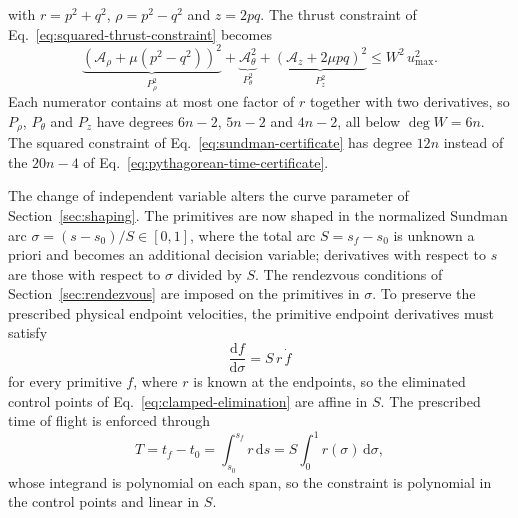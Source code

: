 with $r=p^2+q^2$, $\rho=p^2-q^2$ and $z=2pq$. The thrust constraint of
Eq.~\eqref{eq:squared-thrust-constraint} becomes
\begin{equation}
	\underbrace{
		\left(\mathcal A_\rho+\mu (p^2-q^2)\right)^2
	}_{P_\rho^{2}}
	+
	\underbrace{
		\mathcal A_\theta^{2}
	}_{P_\theta^{2}}
	+
	\underbrace{
		\left(\mathcal A_z+2\mu pq\right)^2
	}_{P_z^{2}}
	\leq
	W^2\,u_{\max}^2.
	\label{eq:sundman-certificate}
\end{equation}
Each numerator contains at most one factor of $r$ together with two
derivatives, so $P_\rho$, $P_\theta$ and $P_z$ have degrees $6n-2$, $5n-2$
and $4n-2$, all below $\deg W=6n$. The squared constraint of
Eq.~\eqref{eq:sundman-certificate} has degree $12n$ instead of the $20n-4$
of Eq.~\eqref{eq:pythagorean-time-certificate}.

The change of independent variable alters the curve parameter of
Section~\ref{sec:shaping}. The primitives are now shaped in the normalized
Sundman arc $\sigma=(s-s_0)/S\in[0,1]$, where the total arc
$S=s_f-s_0$ is unknown a priori and becomes an additional decision variable;
derivatives with respect to $s$ are those with respect to $\sigma$ divided by
$S$. The rendezvous conditions of Section~\ref{sec:rendezvous} are imposed
on the primitives in $\sigma$. To preserve the prescribed physical endpoint
velocities, the primitive endpoint derivatives must satisfy
\begin{equation}
	\frac{\mathrm{d}f}{\mathrm{d}\sigma}=S\,r\,\dot f
	\label{eq:sundman-endpoint-rates}
\end{equation}
for every primitive $f$, where $r$ is known at the endpoints, so the
eliminated control points of Eq.~\eqref{eq:clamped-elimination} are affine
in $S$. The prescribed time of flight is enforced through
\begin{equation}
	T=t_f-t_0
	=\int_{s_0}^{s_f}r\,\mathrm{d}s
	=S\int_{0}^{1}r(\sigma)\,\mathrm{d}\sigma,
	\label{eq:normalized-sundman-time-of-flight}
\end{equation}
whose integrand is polynomial on each span, so the constraint is polynomial
in the control points and linear in $S$.
